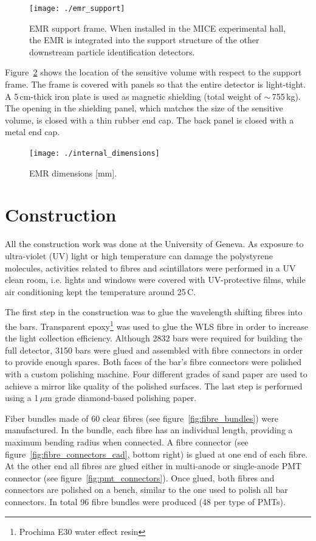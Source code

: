 \documentclass[a4paper,11pt]{article}
\begin{document}
\begin{figure}[htp!]
 \centering 
 \texttt{[image: ./emr\_support]}
 \caption[EMR support frame]{EMR support frame. When installed in the MICE experimental hall, the EMR is integrated into the support structure of the other 
 downstream particle identification detectors.}
 \label{fig:emr_support}
\end{figure}

Figure~\ref{fig:internal_dimensions} shows the location of the sensitive volume with respect to the support frame. The frame is covered with panels so that
the entire detector is light-tight. A 5\,cm-thick iron plate is used as magnetic shielding (total weight of $\sim\,$755\,kg). The opening in the shielding
panel, which matches the size of the sensitive volume, is closed with a thin rubber end cap. The back panel is closed with a metal end cap.

\begin{figure}[htp!]
 \centering
 \texttt{[image: ./internal\_dimensions]}
 \caption[EMR dimensions]{EMR dimensions [mm].}
 \label{fig:internal_dimensions}
\end{figure}

\section{Construction}\label{sec:construction}

All the construction work was done at the University of Geneva. As exposure to ultra-violet (UV) light or high temperature
can damage the polystyrene molecules,
activities related to fibres and scintillators were performed in a UV clean room, i.e. lights and windows were covered with UV-protective films, while air conditioning
kept the temperature around 25\,\degree C. 

The first step in the construction was to glue the wavelength shifting fibres
into the bars. Transparent epoxy\footnote{Prochima E30 water effect resin} was used to glue the WLS fibre in order to increase the light collection
efficiency. Although 2832 bars were required for building the full detector, 3150 bars were glued and assembled with fibre connectors in
order to provide enough spares. Both faces of the bar's fibre connectors were polished with a custom polishing machine. Four
different grades of sand paper are used to achieve a mirror like quality of the polished surfaces. The last step is performed using a 1\,$\mu$m grade
diamond-based polishing paper.

Fiber bundles made of 60 clear fibres (see figure~\ref{fig:fibre_bundles}) were manufactured. In the bundle, each fibre has an individual length, providing
a maximum bending radius when connected. A fibre connector (see figure~\ref{fig:fibre_connectors_cad}, bottom right) is glued at one end of each fibre. At
the other end all fibres are glued either in multi-anode or single-anode PMT connector (see figure~\ref{fig:pmt_connectors}). Once glued, both fibres and
connectors are polished on a bench, similar to the one used to polish all bar connectors. In total 96 fibre bundles were produced (48 per type of PMTs).
\end{document}

